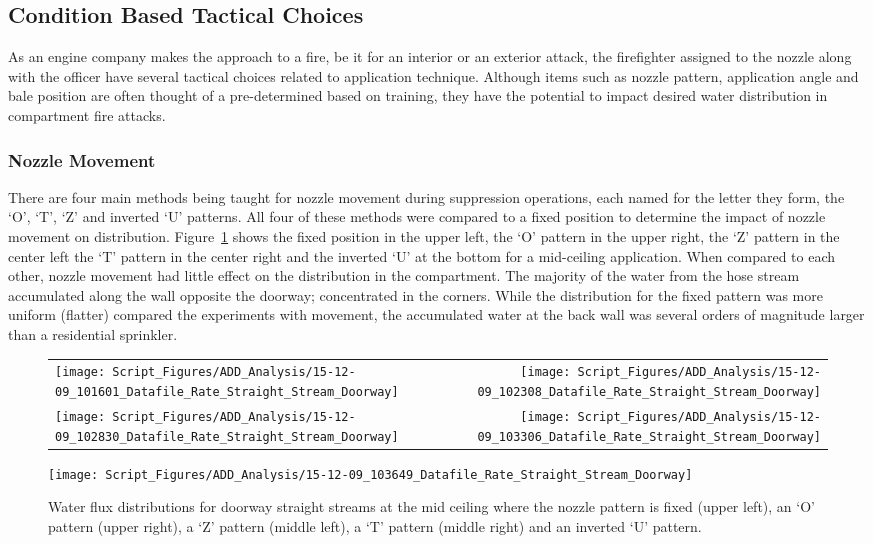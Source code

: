 \documentclass[12pt,oneside]{book}
\begin{document}
\subsection{Condition Based Tactical Choices}
As an engine company makes the approach to a fire, be it for an interior or an exterior attack, the firefighter assigned to the nozzle along with the officer have several tactical choices related to application technique. Although items such as nozzle pattern, application angle and bale position are often thought of a pre-determined based on training, they have the potential to impact desired water distribution in compartment fire attacks. 

\subsubsection{Nozzle Movement}
There are four main methods being taught for nozzle movement during suppression operations, each named for the letter they form, the `O', `T', `Z' and inverted `U' patterns. All four of these methods were compared to a fixed position to determine the impact of nozzle movement on distribution. Figure~\ref{fig:Nozzle Movements Example, First Floor Doorway} shows the fixed position in the upper left, the `O' pattern in the upper right, the `Z' pattern in the center left the `T' pattern in the center right and the inverted `U' at the bottom for a mid-ceiling application. When compared to each other, nozzle movement had little effect on the distribution in the compartment. The majority of the water from the hose stream accumulated along the wall opposite the doorway; concentrated in the corners. While the distribution for the fixed pattern was more uniform (flatter) compared the experiments with movement, the accumulated water at the back wall was several orders of magnitude larger than a residential sprinkler. 

\begin{figure}[ht]
\begin{tabular*}{\textwidth}{lr}
\texttt{[image: Script\_Figures/ADD\_Analysis/15-12-09\_101601\_Datafile\_Rate\_Straight\_Stream\_Doorway]} &
\texttt{[image: Script\_Figures/ADD\_Analysis/15-12-09\_102308\_Datafile\_Rate\_Straight\_Stream\_Doorway]} \\
\texttt{[image: Script\_Figures/ADD\_Analysis/15-12-09\_102830\_Datafile\_Rate\_Straight\_Stream\_Doorway]} &
\texttt{[image: Script\_Figures/ADD\_Analysis/15-12-09\_103306\_Datafile\_Rate\_Straight\_Stream\_Doorway]} \\
\end{tabular*}
\centering
\texttt{[image: Script\_Figures/ADD\_Analysis/15-12-09\_103649\_Datafile\_Rate\_Straight\_Stream\_Doorway]}
\caption[Straight Stream Varied Nozzle Movements, First Floor Doorway]{Water flux distributions for doorway straight streams at the mid ceiling where the nozzle pattern is fixed (upper left), an `O' pattern (upper right), a `Z' pattern (middle left), a `T' pattern (middle right) and an inverted `U' pattern. }
\label{fig:Nozzle Movements Example, First Floor Doorway}
\end{figure}
\end{document}
